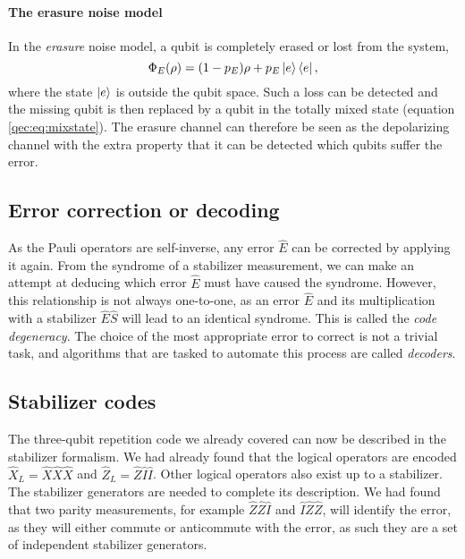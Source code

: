 \paragraph{The erasure noise model}
In the \emph{erasure} noise model, a qubit is completely erased or lost from the system,
\begin{equation}\label{qec:eq:erasure}
  \Phi_E(\rho) = (1-p_E)\rho + p_E\ket{e}\bra{e},
\end{equation}
where the state $\ket{e}$ is outside the qubit space. Such a loss can be detected and the missing qubit is then replaced by a qubit in the totally mixed state (equation \eqref{qec:eq:mixstate}). The erasure channel can therefore be seen as the depolarizing channel with the extra property that it can be detected which qubits suffer the error.


\subsection{Error correction or decoding}

As the Pauli operators are self-inverse, any error $\hat{E}$ can be corrected by applying it again. From the syndrome of a stabilizer measurement, we can make an attempt at deducing which error $\hat{E}$ must have caused the syndrome. However, this relationship is not always one-to-one, as an error $\hat{E}$ and its multiplication with a stabilizer $\hat{E}\hat{S}$ will lead to an identical syndrome. This is called the \emph{code degeneracy}. The choice of the most appropriate error to correct is not a trivial task, and algorithms that are tasked to automate this process are called \emph{decoders}.

\subsection{Stabilizer codes}

The three-qubit repetition code we already covered can now be described in the stabilizer formalism. We had already found that the logical operators are encoded $\hat{X}_L = \hat{X}\hat{X}\hat{X}$ and $\hat{Z}_L = \hat{Z}\hat{I}\hat{I}$. Other logical operators also exist up to a stabilizer. The stabilizer generators are needed to complete its description. We had found that two parity measurements, for example $\hat{Z}\hat{Z}\hat{I}$ and $\hat{I}\hat{Z}\hat{Z}$, will identify the error, as they will either commute or anticommute with the error, as such they are a set of independent stabilizer generators. 

